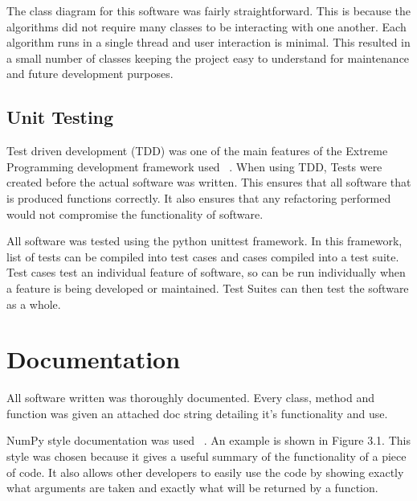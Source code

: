 \documentclass{UoYCSproject}
\begin{document}
The class diagram for this software was fairly straightforward. This is because the algorithms did not require many classes to be interacting with one another. Each algorithm runs in a single thread and user interaction is minimal. This resulted in a small number of classes keeping the project easy to understand for maintenance and future development purposes.
 
\subsection{Unit Testing}
Test driven development (TDD) was one of the main features of the Extreme Programming development framework used  ~\parencite{janzen2005test}. When using TDD, Tests were created before the actual software was written. This ensures that all software that is produced functions correctly. It also ensures that any refactoring performed would not compromise the functionality of software.

All software was tested using the python unittest framework. In this framework, list of tests can be compiled into test cases and cases compiled into a test suite. Test cases test an individual feature of software, so can be run individually when a feature is being developed or maintained. Test Suites can then test the software as a whole.

\section{Documentation}
All software written was thoroughly documented. Every class, method and function was given an attached doc string detailing it's functionality and use.

NumPy style documentation was used ~\parencite{Numpy}. An example is shown in Figure 3.1. This style was chosen because it gives a useful summary of the functionality of a piece of code. It also allows other developers to easily use the code by showing exactly what arguments are taken and exactly what will be returned by a function.\\
\end{document}
